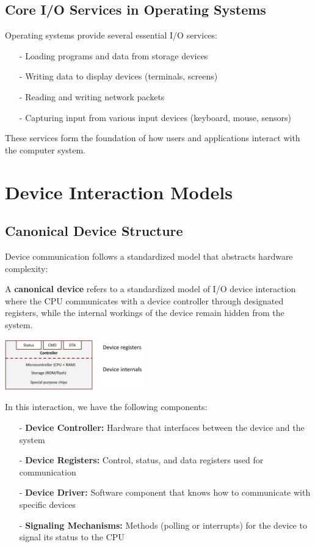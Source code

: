 \documentclass[../../compsys.tex]{subfiles}
\begin{document}
\subsection{Core I/O Services in Operating Systems}
Operating systems provide several essential I/O services:
\begin{itemize}
    \item[-] Loading programs and data from storage devices
    \item[-] Writing data to display devices (terminals, screens)
    \item[-] Reading and writing network packets
    \item[-] Capturing input from various input devices (keyboard, mouse, sensors)
\end{itemize}

These services form the foundation of how users and applications interact with the computer system.

\section{Device Interaction Models}

\subsection{Canonical Device Structure}
Device communication follows a standardized model that abstracts hardware complexity:\\[5px]

\begin{definition}
A \textbf{canonical device} refers to a standardized model of I/O device interaction where the CPU communicates with a device controller through designated registers, while the internal workings of the device remain hidden from the system.
\end{definition}
\vspace{5px}
\begin{center}
  \includegraphics[width=0.45\textwidth]{chapters/L8/images/canonical_device.png}
\end{center}

In this interaction, we have the following components:
\begin{itemize}
    \item[-] \textbf{Device Controller:} Hardware that interfaces between the device and the system
    \item[-] \textbf{Device Registers:} Control, status, and data registers used for communication
    \item[-] \textbf{Device Driver:} Software component that knows how to communicate with specific devices
    \item[-] \textbf{Signaling Mechanisms:} Methods (polling or interrupts) for the device to signal its status to the CPU
\end{itemize}
\end{document}
